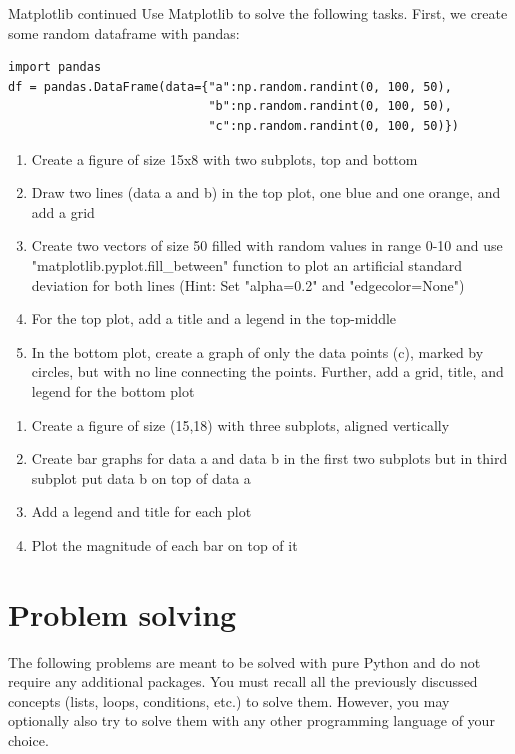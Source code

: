 \documentclass[twoside]{article}
\begin{document}
\newpage
\begin{task}{Matplotlib continued}{}{}
Use Matplotlib to solve the following tasks.
First, we create some random dataframe with pandas:
\begin{lstlisting}[numbers=none]
import pandas
df = pandas.DataFrame(data={"a":np.random.randint(0, 100, 50),
                            "b":np.random.randint(0, 100, 50),
                            "c":np.random.randint(0, 100, 50)})
\end{lstlisting}


\begin{enumerate}
    \item Create a figure of size 15x8 with two subplots, top and bottom
    \item Draw two lines (data a and b) in the top plot, one blue and one orange, and add a grid
    \item Create two vectors of size 50 filled with random values in range 0-10 and use "matplotlib.pyplot.fill\_between" function to plot an artificial standard deviation for both lines (Hint: Set "alpha=0.2" and "edgecolor=None")
    \item For the top plot, add a title and a legend in the top-middle
    \item In the bottom plot, create a graph of only the data points (c), marked by circles, but with no line connecting the points. Further, add a grid, title, and legend for the bottom plot
\end{enumerate}

\begin{enumerate}
    \item Create a figure of size (15,18) with three subplots, aligned vertically
    \item Create bar graphs for data a and data b in the first two subplots but in third subplot put data b on top of data a
    \item Add a legend and title for each plot
    \item Plot the magnitude of each bar on top of it
\end{enumerate}

\end{task}

\clearpage
\section{Problem solving}
The following problems are meant to be solved with pure Python and do not require any additional packages. 
You must recall all the previously discussed concepts (lists, loops, conditions, etc.) to solve them.
However, you may optionally also try to solve them with any other programming language of your choice.
\end{document}
